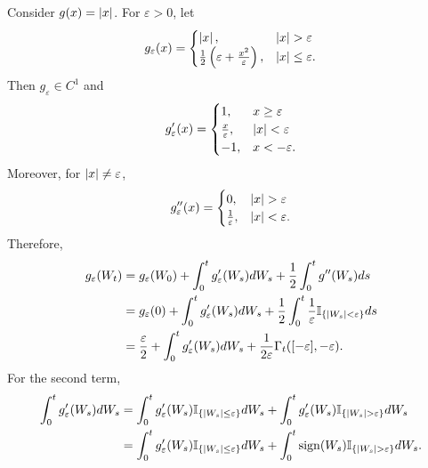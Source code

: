\noindent Consider $g(x) = \left\lvert x\right\lvert$. For $\varepsilon > 0$, let
\begin{equation*}
    g_\varepsilon(x) = \begin{cases}
        \left\lvert x\right\lvert,& \left\lvert x\right\lvert > \varepsilon \\
        \frac{1}{2}\left(\varepsilon+ \frac{x^2}{\varepsilon}\right),& \left\lvert x\right\lvert \leq \varepsilon.
    \end{cases}
\end{equation*}
Then $g_\varepsilon \in C^1$ and
\begin{equation*}
    g^\prime_\varepsilon(x) = \begin{cases}
        1,&x \geq \varepsilon \\
        \frac{x}{\varepsilon},&\left\lvert x\right\lvert < \varepsilon \\
        -1,& x < -\varepsilon.
    \end{cases}
\end{equation*}
Moreover, for $\left\lvert x\right\lvert \neq \varepsilon$,
\begin{equation*}
    g^{\prime\prime}_\varepsilon(x) = \begin{cases}
        0,&\left\lvert x\right\lvert > \varepsilon \\
        \frac{1}{\varepsilon},&\left\lvert x\right\lvert < \varepsilon.
    \end{cases}
\end{equation*}
Therefore,
\begin{align*}
    g_\varepsilon(W_t) &= g_\varepsilon(W_0) + \int_0^t g_\varepsilon^\prime(W_s)dW_s + \frac{1}{2}\int_0^t g^{\prime\prime}(W_s)ds \\
    &= g_\varepsilon(0) + \int_0^t g_\varepsilon^\prime(W_s)dW_s + \frac{1}{2} \int_0^t \frac{1}{\varepsilon}\mathbb{I}_{\left\{\left\lvert W_s\right\lvert < \varepsilon\right\} } ds \\
    &= \frac{\varepsilon}{2} + \int_0^t g_\varepsilon^\prime(W_s)dW_s + \frac{1}{2 \varepsilon} \Gamma_t([-\varepsilon],-\varepsilon).
\end{align*}
For the second term,
\begin{align*}
    \int_0^t g_\varepsilon^\prime(W_s)dW_s & = \int_0^t g_\varepsilon^\prime(W_s)\mathbb{I}_{\left\{\left\lvert W_s\right\lvert \leq \varepsilon\right\}}dW_s +\int_0^t g_\varepsilon^\prime(W_s)\mathbb{I}_{\left\{\left\lvert W_s\right\lvert > \varepsilon\right\}}dW_s \\
    &= \int_0^t g_\varepsilon^\prime(W_s)\mathbb{I}_{\left\{\left\lvert W_s\right\lvert \leq \varepsilon\right\}}dW_s +\int_0^t \operatorname{sign}(W_s)\mathbb{I}_{\left\{\left\lvert W_s\right\lvert > \varepsilon\right\}}dW_s. \\
\end{align*}
